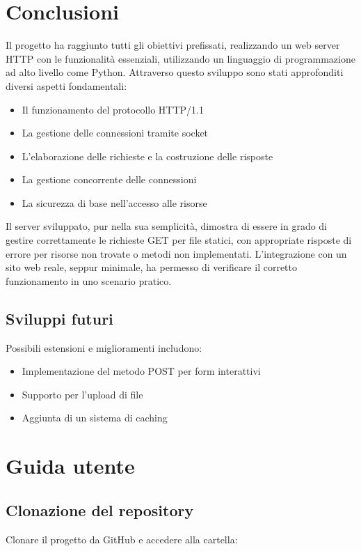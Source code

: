 \documentclass[a4paper,12pt]{report}
\begin{document}
\chapter{Conclusioni}
Il progetto ha raggiunto tutti gli obiettivi prefissati, realizzando un web server HTTP con le funzionalità essenziali, utilizzando un
linguaggio di programmazione ad alto livello come Python. Attraverso questo sviluppo sono stati approfonditi diversi aspetti fondamentali:
\begin{itemize}
    \item Il funzionamento del protocollo HTTP/1.1
    \item La gestione delle connessioni tramite socket
    \item L'elaborazione delle richieste e la costruzione delle risposte
    \item La gestione concorrente delle connessioni
    \item La sicurezza di base nell'accesso alle risorse
\end{itemize}

Il server sviluppato, pur nella sua semplicità, dimostra di essere in grado di gestire correttamente le richieste GET per file statici, con
appropriate risposte di errore per risorse non trovate o metodi non implementati. L'integrazione con un sito web reale, seppur minimale, ha permesso di
verificare il corretto funzionamento in uno scenario pratico.

\section{Sviluppi futuri}
Possibili estensioni e miglioramenti includono:
\begin{itemize}
    \item Implementazione del metodo POST per form interattivi
    \item Supporto per l'upload di file
    \item Aggiunta di un sistema di caching
\end{itemize}

\appendix
\chapter{Guida utente}
\section{Clonazione del repository}
Clonare il progetto da GitHub e accedere alla cartella:
\end{document}
